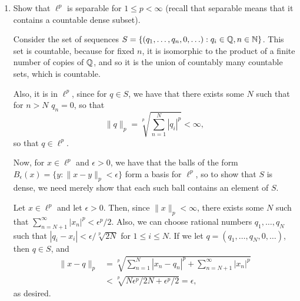 \documentclass[11pt]{article}
\begin{document}
\begin{enumerate}[label=\arabic*.]
\begin{enumerate}
        Finally, consider the case $0 < \|x\| < 1$.
        Define $e_1 = x / \|x\|$.
        Then, $\|e_1\| = 1$.
        We can then, by the Gram-Schmidt process construct an orthonormal sequence $(e_1, e_2, \ldots)$.
        Now, let $\lambda = \sqrt{1 - \|x\|^2}$.
        Let $y_n = x + \lambda e_{n+1}$.
        In particular, since $e_n \perp x$ for $n > 1$, we have that
        \[
        \|y_n\|^2 = \|x + \lambda e_{n+1}\|^2 = \|x\|^2 + \lambda^2 = 1
        \] 
        so that $\|y_n\| = 1$.
        Thus, $y_n \in S$ for $n \in \N$.

        To show that $y_n \to x$ weakly, let $f \in \mathcal{H}^{*}$.
        Then, 
        \[
        |f(y_n - x)| = |f(\lambda e_{n+1})| = |\lambda| |f(e_{n+1})| \to 0 \text{ since } \{e_{n}\}_{n=2}^{\infty} \text{ orthonormal ($f(e_n)\to^w 0$ by part (a))}
        .\] 
        Since $f$ was arbitrary, we conclude $y_n \to x$ weakly.
\end{enumerate}
\vspace{1em}

\item Show that $\ell^p$ is separable for $1 \le p < \infty$ (recall that separable means that it contains a countable dense subset).

\vspace{1em}

Consider the set of sequences $S = \{(q_1, \ldots, q_n, 0, \ldots) : q_i \in \mathbb{Q}, n \in \mathbb{N} \}$.
This set is countable, because for fixed $n$, it is isomorphic to the product of a finite number of copies of $\mathbb{Q}$, and so it is the union of countably many countable sets, which is countable.

Also, it is in $\ell^{p}$, since for $q \in S$, we have that there exists some $N$ such that for $n > N$ $q_n = 0$, so that
\[
    \|q\|_{p} = \sqrt[p]{\sum_{n = 1}^{N} |q_i|^{p}} < \infty
,\] 
so that $q \in \ell^{p}$.

Now, for $x \in \ell^{p}$ and $\epsilon > 0$, we have that the balls of the form $B_{\epsilon}(x) = \{ y : \|x - y\|_{p} < \epsilon\} $ form a basis for $\ell^{p}$, so to show that $S$ is dense, we need merely show that each such ball contains an element of $S$.


Let $x \in \ell^{p}$ and let $\epsilon > 0$.
Then, since $\|x\|_{p} < \infty$, there exists some $N$ such that $\sum_{n = N + 1}^{\infty} |x_n|^{p} < \epsilon^{p} / 2$.
Also, we can choose rational numbers $q_1, \ldots, q_N$ such that $|q_i - x_i| < \epsilon / \sqrt[p]{2N}$ for $1 \leq i \leq N$.
If we let $q = (q_1, \ldots, q_N, 0, \ldots)$, then $q \in S$, and 
\begin{align*}
    \|x - q\|_{p} &= \sqrt[p]{\sum_{n = 1}^{N} |x_n - q_n|^{p} + \sum_{n = N+1}^{\infty} |x_n|^{p}}\\
    &< \sqrt[p]{N\epsilon^{p} / 2N + \epsilon^{p} / 2} = \epsilon 
,\end{align*}
as desired.



\end{enumerate}
\end{document}
